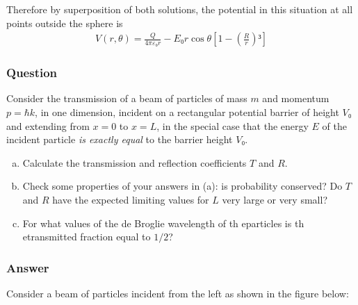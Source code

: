 Therefore by superposition of both solutions, the potential in this situation
at all points outside the sphere is
\begin{align}
    \boxed{ V(r,θ) = \frac{Q}{4πε₀r} - E₀r\cos θ \left[ 1 -
        (\frac{R}{r})³ \right] }
\end{align}

\subsubsection{Question}

Consider the transmission of a beam of particles of mass $m$ and momentum $p
= ℏk$, in one dimension, incident on a rectangular potential barrier of
height $V₀$ and extending from $x = 0$ to $x = L$, in the special case that
the energy $E$ of the incident particle \emph{is exactly equal} to the
barrier height $V₀$.
\begin{enumerate}[(a)]
    \item
        Calculate the transmission and reflection coefficients $T$ and $R$.
    \item
        Check some properties of your answers in (a): is probability
        conserved? Do $T$ and $R$ have the expected limiting values for $L$
        very large or very small?
    \item
        For what values of the de Broglie wavelength of th eparticles is th
        etransmitted fraction equal to $1/2$?
\end{enumerate}

\subsubsection{Answer}

Consider a beam of particles incident from the left as shown in the figure
below:
\begin{figure}[H]
    \centering
\end{figure}

